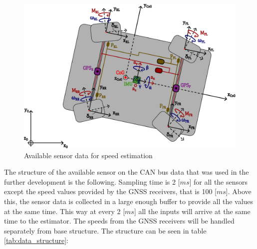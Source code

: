 \FloatBarrier
\begin{figure}[ht]
    \centering
    \includegraphics[width=1\textwidth]{images/sensors.pdf}
    \caption{Available sensor data for speed estimation}
    \label{fig:sensors}
\end{figure}
\FloatBarrier

The structure of the available sensor on the CAN bus data that was used in the further development is the following. Sampling time is 2 [$ms$] for all the sensors except the speed values provided by the GNSS receivers, that is 100 [$ms$]. Above this, the sensor data is collected in a large enough buffer to provide all the values at the same time. This way at every 2 [$ms$] all the inputs will arrive at the same time to the estimator. The speeds from the GNSS receivers will be handled separately from base structure. The structure can be seen in table \ref{tab:data_structure}:

